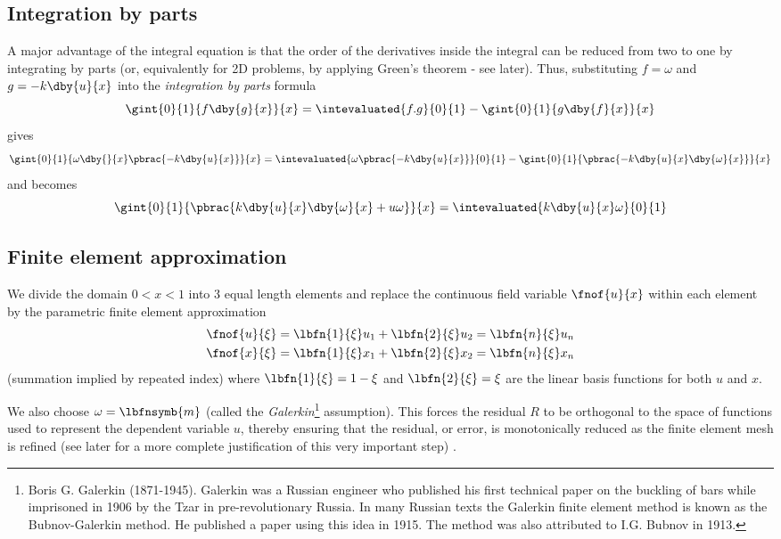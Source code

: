 \subsection{Integration by parts}

A major advantage of the integral equation is that the order of the
derivatives inside the integral can be reduced from two to one by integrating
by parts (or, equivalently for 2D problems, by applying Green's theorem - see
later).  Thus, substituting $f=\omega$ and $g=-k\dby{u}{x}$ into the
\emph{integration by parts} formula
\begin{equation*}
  \gint{0}{1}{f\dby{g}{x}}{x} = \intevaluated{f.g}{0}{1}- \gint{0}{1}{g\dby{f}{x}}{x}
\end{equation*}
gives
\begin{equation*}
  \gint{0}{1}{\omega\dby{ }{x}\pbrac{-k\dby{u}{x}}}{x} 
  = \intevaluated{\omega\pbrac{-k\dby{u}{x}}}{0}{1}-
  \gint{0}{1}{\pbrac{-k\dby{u}{x}\dby{\omega}{x}}}{x}
\end{equation*}
and  becomes 
\begin{equation}
  \gint{0}{1}{\pbrac{k \dby{u}{x}\dby{\omega}{x}+u\omega}}{x} = \intevaluated{k\dby{u}{x}\omega}{0}{1}
  \label{eqn:integration_by_parts}
\end{equation}

\subsection{Finite element approximation}

We divide the domain  $0<x<1$ into 3 equal length elements and replace the 
continuous field variable $\fnof{u}{x}$ within each element by the parametric
finite element approximation
\begin{align*}
  \fnof{u}{\xi}&=\lbfn{1}{\xi}u_{1}+\lbfn{2}{\xi}u_{2}=\lbfn{n}{\xi}u_{n}\\
  \fnof{x}{\xi}&=\lbfn{1}{\xi}x_{1}+\lbfn{2}{\xi}x_{2}=\lbfn{n}{\xi}x_{n}
\end{align*}
(summation implied by repeated index)
where $\lbfn{1}{\xi}=1-\xi$ and $\lbfn{2}{\xi}=\xi$ are the linear basis 
functions for both $u$ and $x$. 

We also choose $\omega=\lbfnsymb{m}$ (called the
\emph{Galerkin}\footnote{Boris G. Galerkin (1871-1945). 
    Galerkin was a Russian engineer who published his
    first technical paper on the buckling of bars while imprisoned in 1906 by
    the Tzar in pre-revolutionary Russia. In many Russian
    texts the Galerkin finite element method is known as the
    Bubnov-Galerkin method.
    He published a paper using this idea in 1915. The method was also attributed
    to I.G. Bubnov in 1913.}
assumption). This forces the
residual $R$ to be orthogonal to the space of functions used to represent the
dependent variable $u$, thereby ensuring that the residual, or error, is
monotonically reduced as the finite element mesh is refined (see later for a
more complete justification of this very important step)
.

